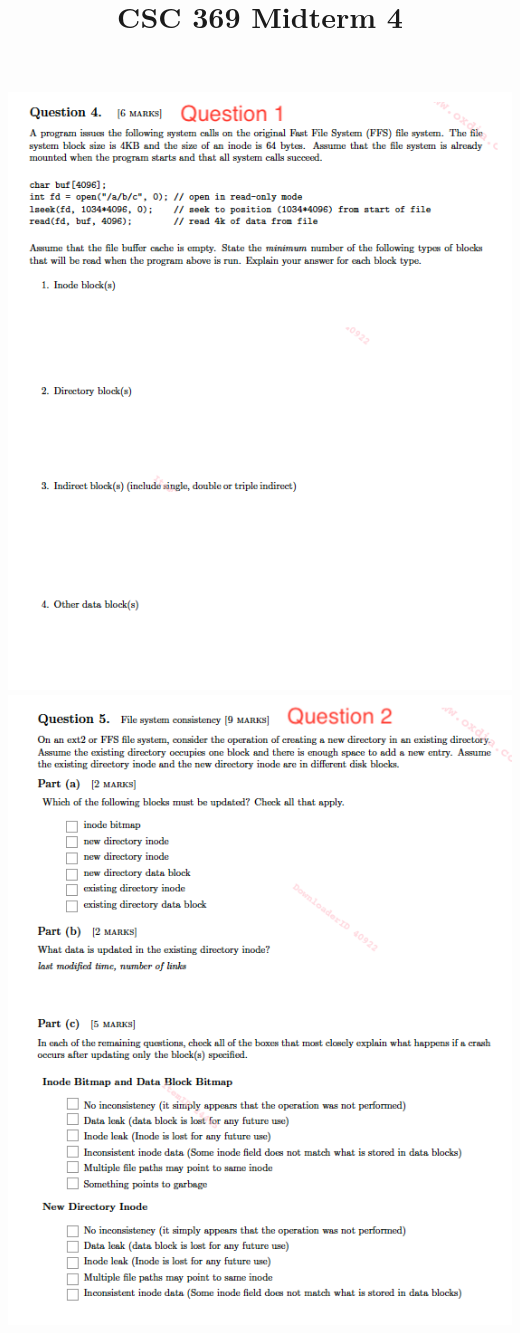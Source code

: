 \documentclass[12pt]{article}
\begin{document}
\title{CSC 369 Midterm 4}

\bigskip

\begin{center}
\includegraphics[width=\linewidth]{../images/midterm_4_1.png}
\includegraphics[width=\linewidth]{../images/midterm_4_2.png}

\end{center}
\end{document}
